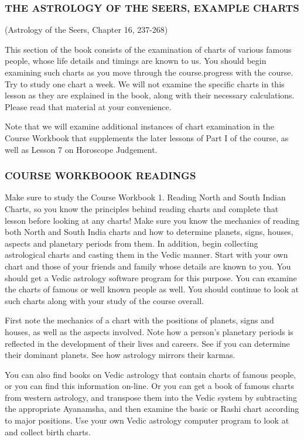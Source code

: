  

\subsubsection{THE ASTROLOGY OF THE SEERS, EXAMPLE CHARTS} (Astrology of the Seers, Chapter 16, 237-268)


This section of the book consists of the examination of charts of various famous people, whose life details and timings are known to us. You should begin examining such charts as you move through the course.progress with the course.  Try to study one chart a week. We will not examine the specific charts in this lesson as they are explained in the book, along with their necessary calculations. Please read that material at your convenience.

Note that we will examine additional instances of chart examination in the Course Workbook that supplements the later lessons of Part I of the course, as well as Lesson 7 on Horoscope Judgement. 

\subsubsection{COURSE WORKBOOOK READINGS}
Make sure to study the Course Workbook 1. Reading North and South Indian Charts, so you know the principles behind reading charts and complete that lesson before looking at any charts!
Make sure you know the mechanics of reading both North and South India charts and how to determine planets, signs, houses, aspects and planetary periods from them.
In addition, begin collecting astrological charts and casting them in the Vedic manner. Start with your own chart and those of your friends and family whose details are known to you. You should get a Vedic astrology software program for this purpose. You can examine the charts of famous or well known people as well. You should continue to look at such charts along with your study of the course overall.

 

First note the mechanics of a chart with the positions of planets, signs and houses, as well as the aspects involved. Note how a person’s planetary periods is reflected in the development of their lives and careers. See if you can determine their dominant planets. See how astrology mirrors their karmas.

 

You can also find books on Vedic astrology that contain charts of famous people, or you can find this information on-line. Or you can get a book of famous charts from western astrology, and transpose them into the Vedic system by subtracting the appropriate Ayanamsha, and then examine the basic or Rashi chart according to major positions. Use your own Vedic astrology computer program to look at and collect birth charts.

